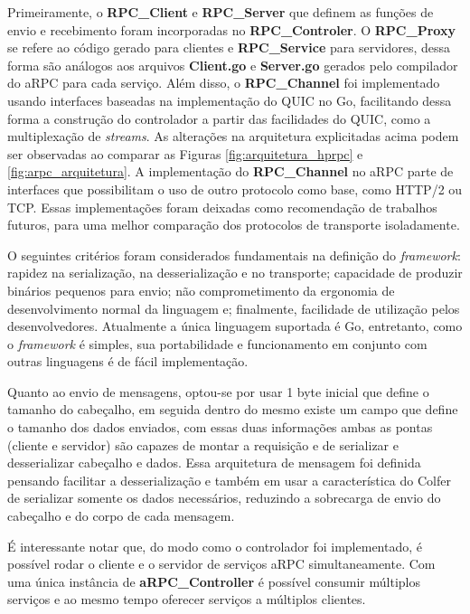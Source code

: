 Primeiramente, o \textbf{RPC\_Client} e \textbf{RPC\_Server} que definem as funções de envio e recebimento foram incorporadas no \textbf{RPC\_Controler}. O \textbf{RPC\_Proxy} se refere ao código gerado para clientes e \textbf{RPC\_Service} para servidores, dessa forma são análogos aos arquivos \textbf{Client.go} e \textbf{Server.go} gerados pelo compilador do aRPC para cada serviço. Além disso, o \textbf{RPC\_Channel} foi implementado usando interfaces baseadas na implementação do QUIC no Go, facilitando dessa forma a construção do controlador a partir das facilidades do QUIC, como a multiplexação de \textit{streams}. As alterações na arquitetura explicitadas acima podem ser observadas ao comparar as Figuras \ref{fig:arquitetura_hprpc} e \ref{fig:arpc_arquitetura}. A implementação do \textbf{RPC\_Channel} no aRPC parte de interfaces que possibilitam o uso de outro protocolo como base, como HTTP/2 ou TCP. Essas implementações foram deixadas como recomendação de trabalhos futuros, para uma melhor comparação dos protocolos de transporte isoladamente.

O seguintes critérios foram considerados fundamentais na definição do \textit{framework}: rapidez na serialização, na desserialização e no transporte; capacidade de produzir binários pequenos para envio; não comprometimento da ergonomia de desenvolvimento normal da linguagem e; finalmente, facilidade de utilização pelos desenvolvedores. Atualmente a única linguagem suportada é Go, entretanto, como o \textit{framework} é simples, sua portabilidade e funcionamento em conjunto com outras linguagens é de fácil implementação.

Quanto ao envio de mensagens, optou-se por usar 1 byte inicial que define o tamanho do cabeçalho, em seguida dentro do mesmo existe um campo que define o tamanho dos dados enviados, com essas duas informações ambas as pontas (cliente e servidor) são capazes de montar a requisição e de serializar e desserializar cabeçalho e dados. Essa arquitetura de mensagem foi definida pensando facilitar a desserialização e também em usar a característica do Colfer de serializar somente os dados necessários, reduzindo a sobrecarga de envio do cabeçalho e do corpo de cada mensagem.

É interessante notar que, do modo como o controlador foi implementado, é possível rodar o cliente e o servidor de serviços aRPC simultaneamente. Com uma única instância de \textbf{aRPC\_Controller} é possível consumir múltiplos serviços e ao mesmo tempo oferecer serviços a múltiplos clientes. 

